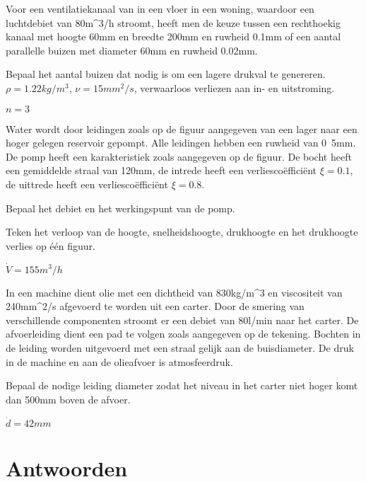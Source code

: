 \begin{toepassing}
	\label{ventilatiekanaal}
	Voor een ventilatiekanaal van in een vloer in een woning, waardoor een luchtdebiet van \unit{80}{m^3/h} stroomt, heeft men de keuze tussen een rechthoekig kanaal met hoogte 60mm en breedte 200mm en ruwheid 0.1mm of een aantal parallelle buizen met diameter 60mm en ruwheid 0.02mm. 
		
	Bepaal het aantal buizen dat nodig is om een lagere drukval te genereren. $\rho = \unit{1.22}{kg/m^3}$, $\nu = \unit{15}{mm^2/s}$, verwaarloos verliezen aan in- en uitstroming.
\end{toepassing}
\begin{antwoord}
	$n = 3$
\end{antwoord}
\begin{toepassing}
	\label{pompopvoerhoogte}
	Water wordt door leidingen zoals op de figuur aangegeven van een lager naar een hoger gelegen reservoir gepompt. Alle leidingen hebben een ruwheid van \unit{0.5}{mm}. De pomp heeft een karakteristiek zoals aangegeven op de figuur. De bocht heeft een gemiddelde straal van \unit{120}{mm}, de intrede heeft een verliescoëfficiënt $\xi = 0.1$, de uittrede heeft een verliesco\"effici\"ent $\xi = 0.8$.
		
	Bepaal het debiet en het werkingspunt van de pomp.
		
	Teken het verloop van de hoogte, snelheidshoogte, drukhoogte en het drukhoogte verlies op \'e\'en figuur.
	\begin{center}
		
	\end{center}
\end{toepassing}
\begin{antwoord}
	$\dot{V} = \unit{155}{m^3/h}$
\end{antwoord}
\begin{toepassing}
	\label{olieafvoerdimensionering}
	In een machine dient olie met een dichtheid van \unit{830}{kg/m^3} en viscositeit van \unit{240}{mm^2/s} afgevoerd te worden uit een carter. Door de smering van verschillende componenten stroomt er een debiet van \unit{80}{l/min} naar het carter. De afvoerleiding dient een pad te volgen zoals aangegeven op de tekening. Bochten in de leiding worden uitgevoerd met een straal gelijk aan de buisdiameter. De druk in de machine en aan de olieafvoer is atmosfeerdruk.
	
	Bepaal de nodige leiding diameter zodat het niveau in het carter niet hoger komt dan 500mm boven de afvoer.
	\begin{center}
		
	\end{center}
\end{toepassing}
\begin{antwoord}
	$\dot{d} = \unit{42}{mm}$
\end{antwoord}
	\section*{Antwoorden}
\begin{multicols}{2}
\end{multicols}